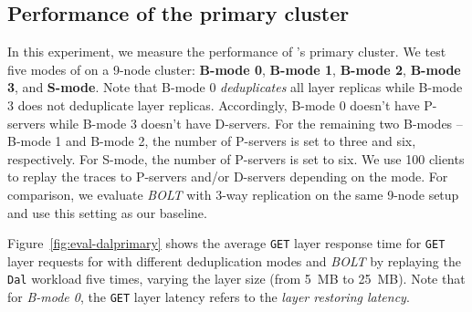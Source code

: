 


\subsection{Performance of the primary cluster }
In this experiment, we measure the performance of \sysname's primary cluster.
%
We test five modes of \sysname on a 9-node cluster: \textbf{B-mode 0},
\textbf{B-mode 1}, \textbf{B-mode 2}, \textbf{B-mode 3}, and \textbf{S-mode}.
Note that 
B-mode 0 \emph{deduplicates} all layer replicas
while
B-mode 3 does not deduplicate layer replicas.
Accordingly,
B-mode 0 doesn't have P-servers
while
B-mode 3 doesn't have D-servers.
%
For the remaining two B-modes -- B-mode 1 and B-mode 2, the number of P-servers
is set to three and six, respectively. For S-mode, the number of P-servers is
set to six.
We use 100 clients to replay the traces to P-servers and/or D-servers
depending on the mode.
%
For comparison, we evaluate \emph{BOLT} with 3-way replication on the same 9-node
setup and use this setting as our baseline. 


Figure~\ref{fig:eval-dalprimary} shows the average \texttt{GET} layer response
time for \texttt{GET} layer requests for \sysname with different deduplication
modes and \emph{BOLT} by replaying the \texttt{Dal} workload five times, varying
the layer size (from 5~MB to 25~MB).
%
Note that for \emph{B-mode 0}, the \texttt{GET} layer latency refers to the
\emph{layer restoring latency}.


